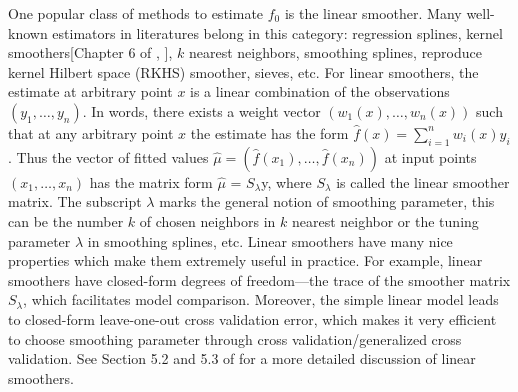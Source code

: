 \documentclass[a4paper]{article}
\begin{document}
One popular class of methods to estimate $f_0$ is the linear smoother. Many well-known estimators in literatures belong in this category: regression splines\cite{de1978practical}, kernel smoothers[Chapter 6 of \cite{friedman2001elements}, \cite{loader2006local}], $k$ nearest neighbors, smoothing splines\cite{de1978practical,wahba1990spline,green1993nonparametric}, reproduce kernel Hilbert space (RKHS) smoother\cite{smola1998learning,wahba1990spline}, sieves\cite{shen1994convergence,wong1995probability}, etc.  For linear smoothers, the estimate at arbitrary point $x$ is a linear combination of the observations $(y_1,\ldots, y_n)$. In words, there exists a weight vector $(w_1(x), \ldots, w_n(x))$ such that at any arbitrary point $x$ the estimate has the form $\hat{f}(x) = \sum_{i=1}^n w_i(x)y_i$. Thus the vector of fitted values $\hat{\mu} = (\hat{f}(x_1), \ldots, \hat{f}(x_n))$ at input points $(x_1, \ldots, x_n)$ has the matrix form $\hat{\mu}$ = $S_\lambda$y, where $S_\lambda$ is called the linear smoother matrix. The subscript $\lambda$ marks the general notion of smoothing parameter, this can be the number $k$ of chosen neighbors in $k$ nearest neighbor or the tuning parameter $\lambda$ in smoothing splines, etc. Linear smoothers have many nice properties which make them extremely useful in practice. For example, linear smoothers have closed-form degrees of freedom\cite{efron1986biased}---the trace of the smoother matrix $S_\lambda$, which facilitates model comparison. Moreover, the simple linear model leads to closed-form leave-one-out cross validation error, which makes it very efficient to choose smoothing parameter through cross validation/generalized cross validation. See Section 5.2 and 5.3 of \cite{wasserman2007all} for a more detailed discussion of linear smoothers.
\end{document}
